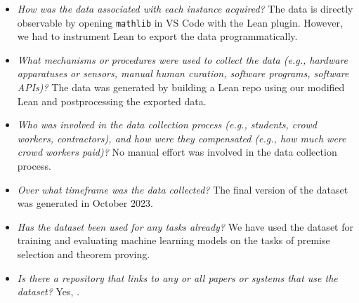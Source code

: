 
\begin{itemize}[leftmargin=*]

\item \emph{How was the data associated with each instance acquired?} The data is directly observable by opening \texttt{mathlib} in VS Code with the Lean plugin. However, we had to instrument Lean to export the data programmatically.

\item \emph{What mechanisms or procedures were used to collect the data (e.g., hardware apparatuses or sensors, manual human curation, software programs, software APIs)?} The data was generated by building a Lean repo using our modified Lean and postprocessing the exported data.

\item \emph{Who was involved in the data collection process (e.g., students, crowd workers, contractors), and how were they compensated (e.g., how much were crowd workers paid)?} No manual effort was involved in the data collection process.

\item \emph{Over what timeframe was the data collected?} The final version of the dataset was generated in October 2023. 

\end{itemize}


\begin{itemize}[leftmargin=*]

\item \emph{Has the dataset been used for any tasks already?} We have used the dataset for training and evaluating machine learning models on the tasks of premise selection and theorem proving.

\item \emph{Is there a repository that links to any or all papers or systems that use the dataset?} Yes, {\weburl}.

\end{itemize}


